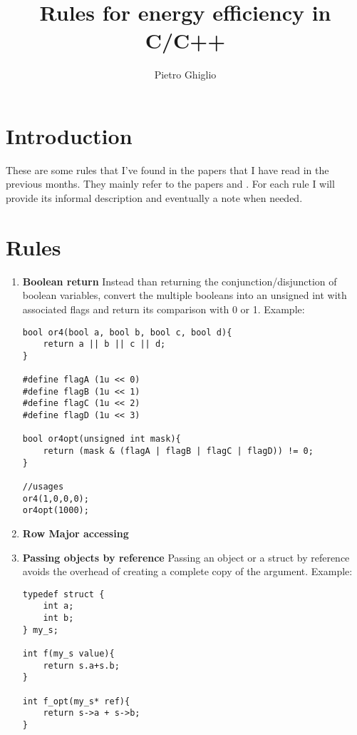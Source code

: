 \documentclass[11pt]{article}
\title{Rules for energy efficiency in C/C++}
\author{Pietro Ghiglio}
\begin{document}
\maketitle
\tableofcontents{}

\section{Introduction}
These are some rules that I've found in the papers that I have read in the previous months.
They mainly refer to the papers \cite{garcia} and \cite{moriso}.
For each rule I will provide its informal description and eventually a note when needed.

\section{Rules}
\begin{enumerate}
\item \textbf{Boolean return} \newline
Instead than returning the conjunction/disjunction of boolean variables, convert the multiple booleans into an unsigned int with associated flags and return its comparison with 0 or 1. \newline
Example:
\begin{lstlisting}
bool or4(bool a, bool b, bool c, bool d){
	return a || b || c || d;
}

#define flagA (1u << 0)
#define flagB (1u << 1)
#define flagC (1u << 2)
#define flagD (1u << 3)

bool or4opt(unsigned int mask){
	return (mask & (flagA | flagB | flagC | flagD)) != 0;
}

//usages
or4(1,0,0,0);
or4opt(1000);
\end{lstlisting}

\item \textbf{Row Major accessing} \newline


\item \textbf{Passing objects by reference} \newline
Passing an object or a struct by reference avoids the overhead of creating a complete copy of the argument. \newline
Example: \newline
\begin{lstlisting}
typedef struct {
	int a;
	int b;
} my_s;

int f(my_s value){
	return s.a+s.b;
}

int f_opt(my_s* ref){
	return s->a + s->b;
}
\end{lstlisting}
\end{enumerate}

\printbibliography[heading=bibintoc,title={References}]
\end{document}
